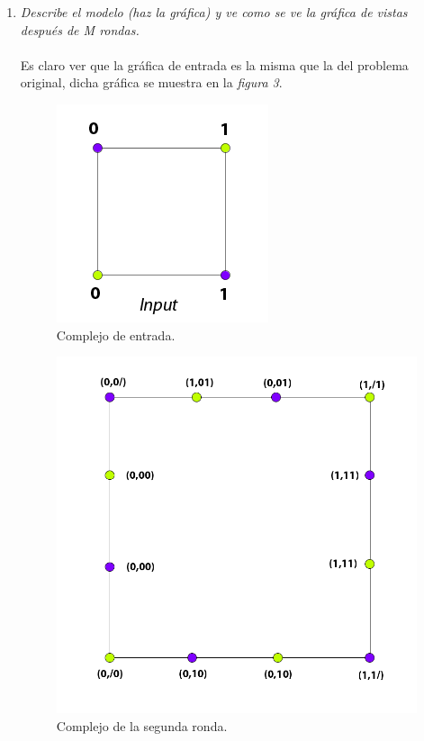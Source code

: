 \documentclass{article}
\begin{document}
\begin{enumerate}
{\begin{enumerate}
    \item{\textsl{Describe el modelo (haz la gráfica) y ve como se ve la gráfica de 
        vistas después de M rondas.}\\
      \\
      Es claro ver que la gráfica de entrada es la misma que la del problema original,
      dicha gráfica se muestra en la \textit{figura 3}.\\
      
      \begin{figure}
        \centering
        \includegraphics[scale=0.6]{3a_input.png}
        \caption{Complejo de entrada.}
      \end{figure}
      
      \begin{figure}
        \centering
        \includegraphics[scale=0.26]{3a_protocol.png}
        \caption{Complejo de la segunda ronda.}
      \end{figure}
          
}
\end{enumerate}}
\end{enumerate}
\end{document}
